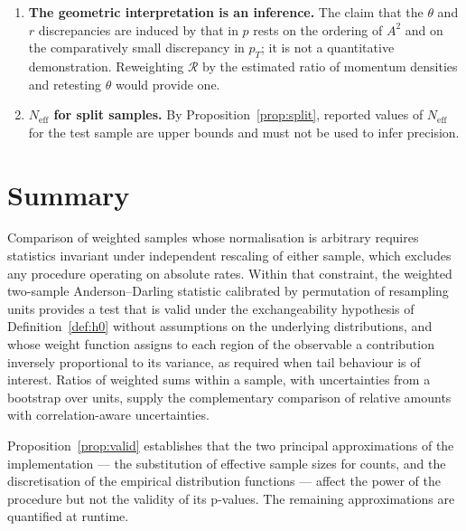 \documentclass[11pt,a4paper]{article}
\theoremstyle{definition}
\theoremstyle{plain}
\theoremstyle{remark}
\newcommand{\Neff}{N_{\mathrm{eff}}}
\newcommand{\Rr}{\mathcal{R}}
\begin{document}
\begin{enumerate}
\item \textbf{The geometric interpretation is an inference.} The claim that the
$\theta$ and $r$ discrepancies are induced by that in $p$ rests on the ordering
of $A^{2}$ and on the comparatively small discrepancy in $p_T$; it is not a
quantitative demonstration. Reweighting $\Rr$ by the estimated ratio of momentum
densities and retesting $\theta$ would provide one.

\item \textbf{$\Neff$ for split samples.} By Proposition~\ref{prop:split},
reported values of $\Neff$ for the test sample are upper bounds and must not be
used to infer precision.
\end{enumerate}

\section{Summary}

Comparison of weighted samples whose normalisation is arbitrary requires
statistics invariant under independent rescaling of either sample, which
excludes any procedure operating on absolute rates. Within that constraint, the
weighted two-sample Anderson--Darling statistic calibrated by permutation of
resampling units provides a test that is valid under the exchangeability
hypothesis of Definition~\ref{def:h0} without assumptions on the underlying
distributions, and whose weight function assigns to each region of the
observable a contribution inversely proportional to its variance, as required
when tail behaviour is of interest. Ratios of weighted sums within a sample,
with uncertainties from a bootstrap over units, supply the complementary
comparison of relative amounts with correlation-aware uncertainties.

Proposition~\ref{prop:valid} establishes that the two principal approximations
of the implementation --- the substitution of effective sample sizes for counts,
and the discretisation of the empirical distribution functions --- affect the
power of the procedure but not the validity of its p-values. The remaining
approximations are quantified at runtime.
\end{document}
